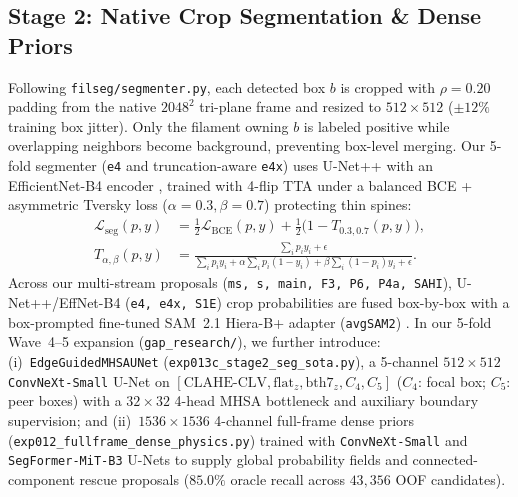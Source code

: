 \documentclass[sigconf]{acmart}
\begin{document}
\subsection{Stage 2: Native Crop Segmentation \& Dense Priors}
Following \texttt{filseg/segmenter.py}, each detected box $b$ is cropped with $\rho = 0.20$ padding from the native $2048^2$ tri-plane frame and resized to $512\times 512$ ($\pm 12\%$ training box jitter). Only the filament owning $b$ is labeled positive while overlapping neighbors become background, preventing box-level merging. Our 5-fold segmenter (\texttt{e4} and truncation-aware \texttt{e4x}) uses U-Net++ \cite{zhou2018unetpp} with an EfficientNet-B4 encoder \cite{tan2019efficientnet}, trained with 4-flip TTA under a balanced BCE + asymmetric Tversky loss \cite{salehi2017tversky} ($\alpha{=}0.3, \beta{=}0.7$) protecting thin spines:
\begin{equation}\label{eq:tversky}
\begin{aligned}
  \mathcal{L}_{\mathrm{seg}}(p,y) &= \tfrac{1}{2}\mathcal{L}_{\mathrm{BCE}}(p,y) + \tfrac{1}{2}\bigl(1 - T_{0.3,0.7}(p,y)\bigr), \\
  T_{\alpha,\beta}(p,y) &= \frac{\sum_i p_i y_i + \epsilon}{\sum_i p_i y_i + \alpha\sum_i p_i(1{-}y_i) + \beta\sum_i (1{-}p_i)y_i + \epsilon}.
\end{aligned}
\end{equation}
Across our multi-stream proposals (\texttt{ms, s, main, F3, P6, P4a, SAHI}), U-Net++/EffNet-B4 (\texttt{e4, e4x, S1E}) crop probabilities are fused box-by-box with a box-prompted fine-tuned SAM~2.1 Hiera-B+ adapter (\texttt{avgSAM2}) \cite{ravi2024sam2}. In our 5-fold Wave~4--5 expansion (\texttt{gap\_\allowbreak research/}), we further introduce: (i)~\texttt{Edge\allowbreak Guided\allowbreak MHSA\allowbreak UNet} (\texttt{exp013c\_\allowbreak stage2\_\allowbreak seg\_\allowbreak sota.py}), a 5-channel $512\times 512$ \texttt{ConvNeXt-\allowbreak Small} \cite{liu2022convnet} U-Net on $[\text{CLAHE-CLV}, \text{flat}_z, \text{bth7}_z, C_4, C_5]$ ($C_4$: focal box; $C_5$: peer boxes) with a $32\times 32$ 4-head MHSA bottleneck and auxiliary boundary supervision; and (ii)~$1536\times 1536$ 4-channel full-frame dense priors (\texttt{exp012\_\allowbreak fullframe\_\allowbreak dense\_\allowbreak physics.py}) trained with \texttt{ConvNeXt-\allowbreak Small} and \texttt{SegFormer-\allowbreak MiT-B3} \cite{xie2021segformer} U-Nets to supply global probability fields and connected-component rescue proposals ($85.0\%$ oracle recall across $43{,}356$ OOF candidates).
\end{document}
